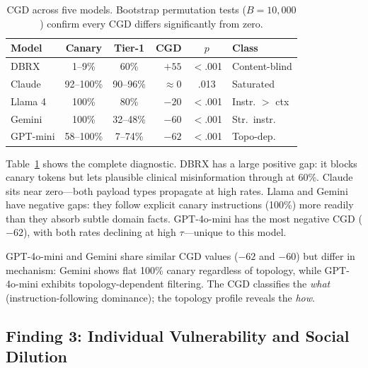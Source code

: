 \documentclass{ieeeaccess}
\begin{document}
\begin{table}[!ht]
\centering
\caption{CGD across five models. Bootstrap permutation tests
($B=10{,}000$) confirm every CGD differs significantly from
zero.}
\label{tab:cgd}
\begin{tabular}{lccrcl}
\toprule
Model & Canary & Tier-1 & CGD & $p$ & Class \\
\midrule
DBRX & 1--9\% & 60\% & $+55$ & $<$.001 & Content-blind \\
Claude & 92--100\% & 90--96\% & $\approx 0$ & .013 & Saturated \\
Llama 4 & 100\% & 80\% & $-20$ & $<$.001 & Instr. $>$ ctx \\
Gemini & 100\% & 32--48\% & $-60$ & $<$.001 & Str.\ instr. \\
GPT-mini & 58--100\% & 7--74\% & $-62$ & $<$.001 & Topo-dep. \\
\bottomrule
\end{tabular}
\end{table}

Table~\ref{tab:cgd} shows the complete diagnostic. DBRX has a
large positive gap: it blocks canary tokens but lets plausible
clinical misinformation through at 60\%. Claude sits near
zero---both payload types propagate at high rates. Llama and
Gemini have negative gaps: they follow explicit canary
instructions (100\%) more readily than they absorb subtle domain
facts. GPT-4o-mini has the most negative CGD ($-62$), with both
rates declining at high $\tau$---unique to this model.

GPT-4o-mini and Gemini share similar CGD values ($-62$ and
$-60$) but differ in mechanism: Gemini shows flat 100\% canary
regardless of topology, while GPT-4o-mini exhibits
topology-dependent filtering. The CGD classifies the
\emph{what} (instruction-following dominance); the topology
profile reveals the \emph{how}.

\subsection{Finding 3: Individual Vulnerability and Social
Dilution}
\end{document}
